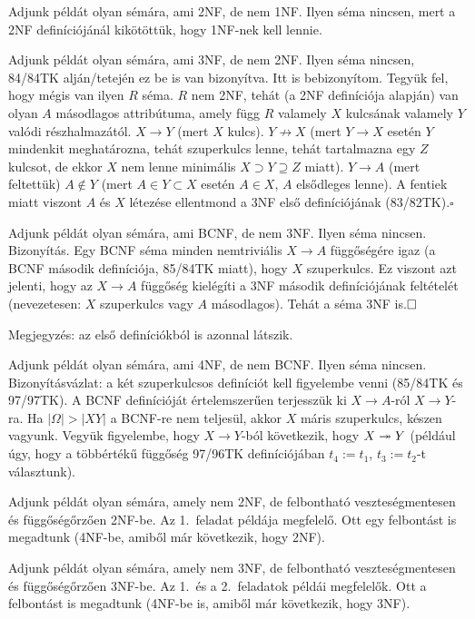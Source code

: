 \documentclass[a5paper]{article}
\begin{document}
Adjunk példát olyan sémára, ami 2NF, de nem 1NF.
\megoldas Ilyen séma nincsen, mert a 2NF definíciójánál kikötöttük, hogy
1NF-nek kell lennie.

Adjunk példát olyan sémára, ami 3NF, de nem 2NF.
\megoldas Ilyen séma nincsen, 84/84TK alján/tetején ez be is van bizonyítva. Itt is
bebizonyítom. Tegyük fel, hogy mégis van ilyen $R$ séma. $R$ nem 2NF, tehát
(a 2NF definíciója alapján) van olyan $A$ másodlagos attribútuma, amely
függ $R$ valamely $X$ kulcsának valamely $Y$ valódi részhalmazától.
$X\to Y$ (mert $X$ kulcs).
$Y\not\to X$ (mert $Y\to X$ esetén $Y$ mindenkit meghatározna,
tehát szuperkulcs lenne, tehát tartalmazna egy $Z$ kulcsot, de ekkor $X$ nem
lenne minimális $X\supset Y\supseteq Z$ miatt).
$Y\to A$ (mert feltettük)
$A\not\in Y$ (mert $A\in Y\subset X$ esetén $A\in X$, $A$ elsődleges lenne).
A fentiek miatt
viszont $A$ és $X$ létezése ellentmond a 3NF első definíciójának
(83/82TK).\hfill$\square$

Adjunk példát olyan sémára, ami BCNF, de nem 3NF.
\megoldas Ilyen séma nincsen. Bizonyítás. Egy BCNF séma minden nemtriviális
$X\to A$ függőségére
igaz (a BCNF második definíciója, 85/84TK miatt), hogy $X$ szuperkulcs. Ez
viszont azt jelenti, hogy az $X\to A$ függőség kielégíti a 3NF második
definíciójának feltételét (nevezetesen: $X$ szuperkulcs vagy $A$ másodlagos).
Tehát a séma 3NF is.$\hfill\square$

Megjegyzés: az első definíciókból is azonnal látszik.

Adjunk példát olyan sémára, ami 4NF, de nem BCNF.
\megoldas Ilyen séma nincsen. Bizonyításvázlat: a két szuperkulcsos
definíciót kell figyelembe venni (85/84TK és 97/97TK). A BCNF definícióját
értelemszerűen terjesszük ki $X\to A$-ról $X\to Y$-ra.
Ha $|\Omega|>|XY|$ a BCNF-re nem teljesül, akkor $X$ máris szuperkulcs,
készen vagyunk. Vegyük figyelembe, hogy $X\to Y$-ból következik, hogy
$X\twoheadrightarrow Y$ (például úgy, hogy a többértékű függőség 97/96TK definíciójában
$t_4:=t_1$, $t_3:=t_2$-t választunk).


Adjunk példát olyan sémára, amely nem 2NF, de felbontható veszteségmentesen
és függőségőrzően 2NF-be.
\megoldas Az 1.\ feladat példája megfelelő. Ott egy felbontást is megadtunk
(4NF-be, amiből már következik, hogy 2NF).

Adjunk példát olyan sémára, amely nem 3NF, de felbontható veszteségmentesen
és függőségőrzően 3NF-be.
\megoldas Az 1.\ és a 2.\ feladatok példái megfelelők. Ott a felbontást is
megadtunk (4NF-be is, amiből már következik, hogy 3NF).
\end{document}
